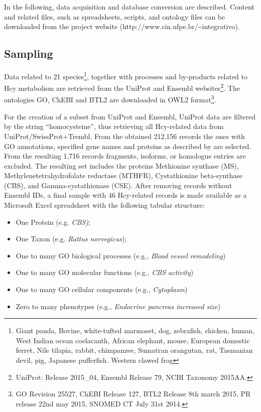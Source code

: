 In the following, data acquisition and database conversion are described. Content and related files, such as spreadsheets, scripts, and ontology files can be downloaded from the project website (http://www.cin.ufpe.br/\~{}integrativo).

\subsection{Sampling} 
Data related to 21 species\footnote{Giant panda, Bovine, white-tufted marmoset, dog, zebrafish, chicken, human, West Indian ocean coelacanth, African elephant, mouse, European domestic ferret, Nile tilapia, rabbit, chimpanzee, Sumatran orangutan, rat, Tasmanian devil, pig, Japanese pufferfish. Western clawed frog}, together with processes and by-products related to Hcy metabolism are retrieved from the UniProt and Ensembl websites\footnote{UniProt: Release 2015\_04, Ensembl Release 79, NCBI Taxonomy 2015AA.}. The ontologies GO, ChEBI and BTL2 are downloaded in OWL2 format\footnote{GO Revision 25527, ChEBI Release 127, BTL2 Release 8th march 2015, PR release 22nd may 2015, SNOMED CT July 31st 2014.}. 

For the creation of a subset from UniProt and Ensembl, UniProt data are filtered by the string ``homocysteine'', thus retrieving all Hcy-related data from UniProt/SwissProt+Trembl. From the obtained  212,156 records the ones with GO annotations, specified gene names and proteins as described by \cite{Selhub1999} are selected. From the resulting 1,716 records fragments, isoforms, or homologue entries are excluded. 
The resulting set includes the proteins Methionine synthase (MS), Methylenetetrahydrofolate reductase (MTHFR), Cystathionine beta-synthase (CBS), and Gamma-cystathionase (CSE). After removing records without Ensembl IDs, a final sample with 46 Hcy-related records is made available as a Microsoft Excel spreadsheet with the following tabular structure:
\begin{itemize}
	\item One Protein (e.g. \textit{CBS)};
	\item One Taxon (e.g. \textit{Rattus norvegicus}); 
	\item One to many GO biological processes (e.g., \textit{Blood vessel remodeling}) 
	\item One to many GO molecular functions (e.g., \textit{CBS activity}) 
	\item One to many GO cellular components (e.g., \textit{Cytoplasm}) 
	\item Zero to many phenotypes (e.g., \textit{Endocrine pancreas increased size}) 	
\end{itemize}

